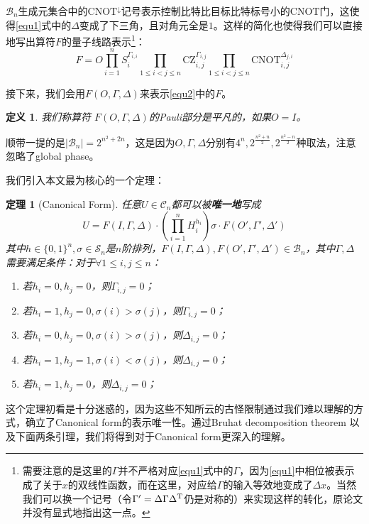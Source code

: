 \documentclass[8pt]{article}
\newtheorem{theorem}{定理}
\newtheorem{definition}{定义}
\begin{document}
$\mathcal B_n$生成元集合中的$\text{CNOT}^{\downarrow}$记号表示控制比特比目标比特标号小的$\text{CNOT}$门，这使得\cref{equ1}式中的$\Delta$变成了下三角，且对角元全是$1$。这样的简化也使得我们可以直接地写出算符$F$的量子线路表示\footnote{需要注意的是这里的$\Gamma$并不严格对应\cref{equ1}式中的$\Gamma$，因为\cref{equ1}中相位被表示成了关于$x$的双线性函数，而在这里，对应给$\Gamma$的输入等效地变成了$\Delta x$。当然我们可以换一个记号（令$\Gamma' = \Delta \Gamma \Delta^{\text T}$仍是对称的）来实现这样的转化，原论文并没有显式地指出这一点。}：
\begin{equation}
F = O\prod_{i=1}^{n}S_i^{\Gamma_{i, i}}\prod_{1 \le i < j \le n}\text{CZ}_{i, j}^{\Gamma_{i, j}} \prod_{1 \le i < j \le n}\text{CNOT}_{i, j}^{\Delta_{j, i}}
\label{equ2}
\end{equation}

接下来，我们会用$F(O, \Gamma, \Delta)$来表示\cref{equ2}中的$F$。
\begin{definition}
	我们称算符 $F(O, \Gamma, \Delta)$的Pauli部分是平凡的，如果$O = I$。
\end{definition}

顺带一提的是$|\mathcal B_n| = 2^{n^2 + 2n}$，这是因为$O, \Gamma, \Delta$分别有$4^n, 2^{\frac{n^2+n}{2}}, 2^{\frac{n^2-n}{2}}$种取法，注意忽略了global phase。

我们引入本文最为核心的一个定理：
\begin{theorem}[Canonical Form]
	任意$U \in \mathcal C_n$都可以被\textbf{唯一地}写成
	\begin{equation}
		U = F(I, \Gamma, \Delta) \cdot \left( \prod_{i=1}^nH_i^{h_i} \right)\sigma \cdot F(O', \Gamma', \Delta')
		\label{canonical}
	\end{equation}
	其中$h \in \{0, 1\}^n, \sigma \in \mathcal S_n$是$n$阶排列，$F(I, \Gamma, \Delta), F(O', \Gamma', \Delta') \in \mathcal B_n$，其中$\Gamma, \Delta$需要满足条件：对于$\forall 1 \le i, j \le n$：
	\begin{enumerate}
		\renewcommand{\labelenumi}{\textbf{C\theenumi} }
		\item 若$h_i = 0, h_j = 0$，则$\Gamma_{i, j} = 0$；
		\item 若$h_i = 1, h_j = 0, \sigma(i) > \sigma(j)$，则$\Gamma_{i, j} = 0$；
		\item 若$h_i = 0, h_j = 0, \sigma(i) > \sigma(j)$，则$\Delta_{i, j} = 0$；
		\item 若$h_i = 1, h_j = 1, \sigma(i) < \sigma(j)$，则$\Delta_{i, j} = 0$；
		\item 若$h_i = 1, h_j = 0$，则$\Delta_{i, j} = 0$；
	\end{enumerate}
	\label{main}
\end{theorem}
\newpage
这个定理初看是十分迷惑的，因为这些不知所云的古怪限制通过我们难以理解的方式，确立了Canonical form的表示唯一性。通过Bruhat decomposition theorem \cite{bruhat} 以及下面两条引理，我们将得到对于Canonical form更深入的理解。
\end{document}
